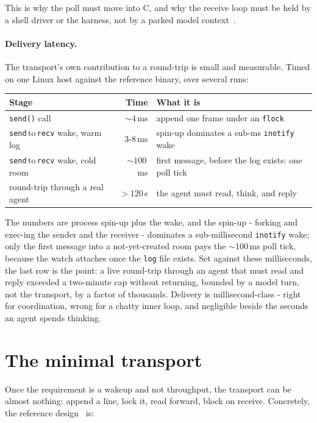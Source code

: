 \documentclass[11pt]{article}
\newcommand{\code}[1]{\texttt{#1}}
\begin{document}
This is why the poll must move into C, and why the receive loop must be held by a shell driver or the harness, not by a parked model context~\cite{receivemodel,skill}.

\paragraph{Delivery latency.} The transport's own contribution to a round-trip is small and measurable. Timed on one Linux host against the reference binary, over several runs:

\begin{center}
\begin{tabular}{@{}l r >{\raggedright\arraybackslash}p{7.1cm}@{}}
\toprule
Stage & Time & What it is \\
\midrule
\code{send()} call & ${\sim}4$\,ms & append one frame under an \code{flock} \\
\code{send}\,to\,\code{recv} wake, warm log & $3$-$8$\,ms & spin-up dominates a sub-ms \code{inotify} wake \\
\code{send}\,to\,\code{recv} wake, cold room & ${\sim}100$\,ms & first message, before the log exists: one poll tick \\
round-trip through a real agent & $>120$\,s & the agent must read, think, and reply \\
\bottomrule
\end{tabular}
\end{center}

\noindent The numbers are process spin-up plus the wake, and the spin-up - forking and exec-ing the sender and the receiver - dominates a sub-millisecond \code{inotify} wake; only the first message into a not-yet-created room pays the $\sim$100\,ms poll tick, because the watch attaches once the \code{log} file exists. Set against these milliseconds, the last row is the point: a live round-trip through an agent that must read and reply exceeded a two-minute cap without returning, bounded by a model turn, not the transport, by a factor of thousands. Delivery is millisecond-class - right for coordination, wrong for a chatty inner loop, and negligible beside the seconds an agent spends thinking.

\section{The minimal transport}

Once the requirement is a wakeup and not throughput, the transport can be almost nothing: append a line, lock it, read forward, block on receive. Concretely, the reference design~\cite{readme} is:
\end{document}
